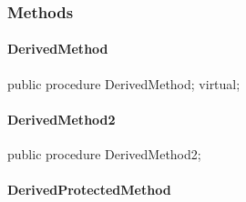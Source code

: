 \documentclass{report}
\begin{document}
\subsubsection*{\large{\textbf{Methods}}\normalsize\hspace{1ex}\hfill}
\paragraph*{DerivedMethod}\hspace*{\fill}

\begin{list}{}{
\setlength{\itemindent}{0cm}
\setlength{\listparindent}{0cm}
\setlength{\leftmargin}{\evensidemargin}
\addtolength{\leftmargin}{\tmplength}
\settowidth{\labelsep}{X}
\addtolength{\leftmargin}{\labelsep}
\setlength{\labelwidth}{\tmplength}
}
\begin{flushleft}
\item[\textbf{Declaration}\hfill]
\begin{ttfamily}
public procedure DerivedMethod; virtual;\end{ttfamily}


\end{flushleft}
\end{list}
\paragraph*{DerivedMethod2}\hspace*{\fill}

\begin{list}{}{
\setlength{\itemindent}{0cm}
\setlength{\listparindent}{0cm}
\setlength{\leftmargin}{\evensidemargin}
\addtolength{\leftmargin}{\tmplength}
\settowidth{\labelsep}{X}
\addtolength{\leftmargin}{\labelsep}
\setlength{\labelwidth}{\tmplength}
}
\begin{flushleft}
\item[\textbf{Declaration}\hfill]
\begin{ttfamily}
public procedure DerivedMethod2;\end{ttfamily}


\end{flushleft}
\end{list}
\paragraph*{DerivedProtectedMethod}\hspace*{\fill}
\end{document}
